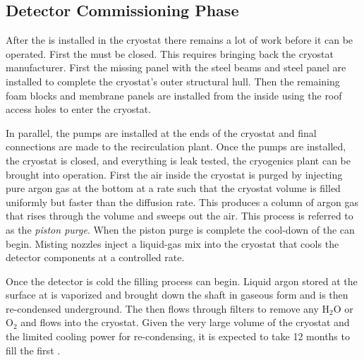 \subsection{Detector Commissioning Phase}
\label{sec:fdsp-tc-inst-comiss}
After the  is installed in the cryostat there remains a lot of work before it can be operated. 
First the  must be closed. 
This requires bringing back the cryostat manufacturer. 
First the missing panel with the steel beams and steel panel are installed to complete the cryostat's outer structural hull. 
Then the remaining foam blocks and membrane panels
are installed from the inside using the roof access holes 
to enter the cryostat. 

In parallel, the \lar pumps are installed at the ends of the cryostat and final connections are made to the recirculation plant. 
Once the pumps are installed, the cryostat is closed, and everything is leak tested, the cryogenics plant can be brought into operation. 
First the air inside the cryostat is purged by injecting pure argon gas at the bottom  at a rate such that the cryostat volume is filled uniformly but faster than the diffusion
rate. 
This produces a column of argon gas that rises through the volume and sweeps out the air. 
This process is referred to as the \textit{piston purge}. 
When the piston purge is complete the cool-down of the  can begin. 
Misting nozzles inject a liquid-gas mix into the cryostat
that cools the detector components at a controlled rate. 

Once the detector is cold the filling process can begin. 
Liquid argon stored at the surface  at \surf is vaporized and brought down the shaft in gaseous form and is then re-condensed underground. 
The \lar then flows through filters to remove any H$_2$O or O$_2$ and flows into the cryostat.
Given the very large volume of the cryostat and the limited cooling power for re-condensing, it is  expected to take \num{12} months to fill the first . 

